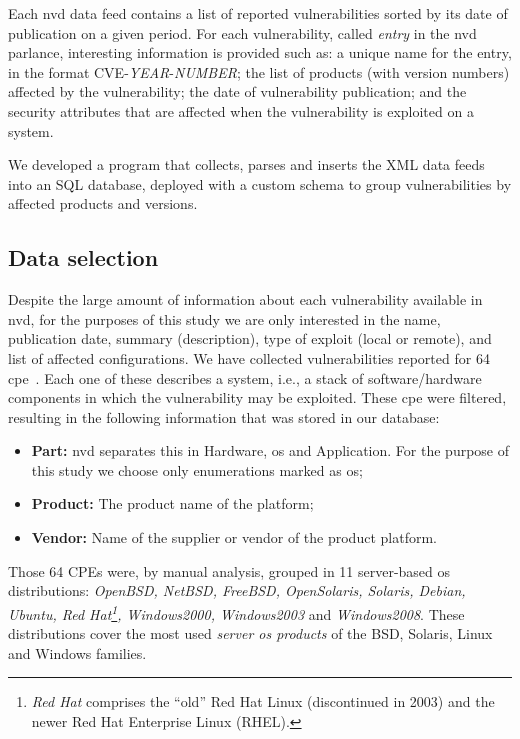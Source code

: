 Each \gls{nvd} data feed contains a list of reported vulnerabilities sorted by its date of publication on a given period.
For each vulnerability, called \emph{entry} in the \gls{nvd} parlance, interesting information is provided such as: a unique name for the entry, in the format CVE-\textit{YEAR}-\textit{NUMBER}; the list of products (with version numbers) affected by the vulnerability; the date of vulnerability publication; and the security attributes that are affected when the vulnerability is exploited on a system.

We developed a program that collects, parses and inserts the XML data feeds into an SQL database, deployed with a custom schema to group vulnerabilities by affected products and versions.

\subsection*{Data selection}
Despite the large amount of information about each vulnerability available in \gls{nvd}, for the purposes of this study we are only interested in the name, publication date, summary (description), type of exploit (local or remote), and list of affected configurations.
We have collected vulnerabilities reported for 64 \gls{cpe}~\cite{cpe}.
Each one of these describes a system, i.e., a stack of software/hardware components in which the vulnerability may be exploited.
These \gls{cpe} were filtered, resulting in the following information that was stored in our database:

\begin{itemize}
\item \textbf{Part:} \gls{nvd} separates this in Hardware, \gls{os} and Application. For the purpose of this study we choose only enumerations marked as \gls{os};
\item \textbf{Product:} The product name of the platform;
\item \textbf{Vendor:} Name of the supplier or vendor of the product platform.
\end{itemize}


Those 64 CPEs were, by manual analysis, grouped in 11 server-based \gls{os} distributions: \textit{OpenBSD, NetBSD, FreeBSD, OpenSolaris, Solaris, Debian, Ubuntu, Red Hat\footnote{\textit{Red Hat} comprises the ``old'' Red Hat Linux (discontinued in 2003) and the newer Red Hat Enterprise Linux (RHEL).}, Windows2000, Windows2003} and \textit{Windows2008}.
These distributions cover the most used \emph{server \gls{os} products} of the BSD, Solaris, Linux and Windows families.

